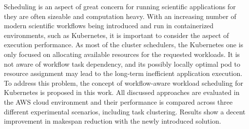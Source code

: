\documentclass[12pt]{article}
\begin{document}




Scheduling is an aspect of great concern for running scientific applications for they are often sizeable and computation heavy.
With an increasing number of modern scientific workflows being introduced and run in containerized environments, such as Kubernetes, it is important to consider the aspect of execution performance.
As most of the cluster schedulers, the Kubernetes one is only focused on allocating available resources for the requested workloads.
It is not aware of workflow task dependency, and its possibly locally optimal pod to resource assignment may lead to the long-term inefficient application execution.
To address this problem, the concept of workflow-aware workload scheduling for Kubernetes is proposed in this work.
All discussed approaches are evaluated in the AWS cloud environment and their performance is compared across three different experimental scenarios, including task clustering.
Results show a decent improvement in makespan reduction with the newly introduced solution.
\end{document}
